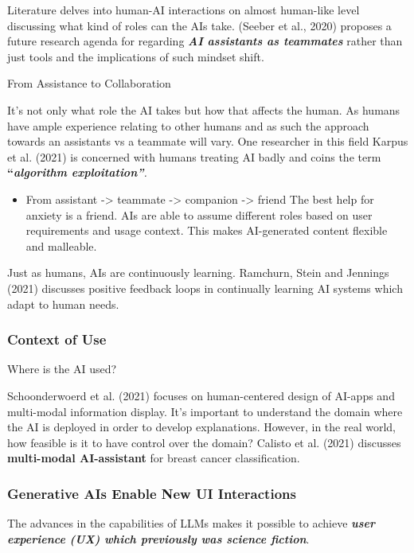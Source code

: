 \documentclass[
  letterpaper,
  DIV=11,
  numbers=noendperiod]{scrartcl}
\providecommand{\tightlist}{%
  \setlength{\itemsep}{0pt}\setlength{\parskip}{0pt}}\usepackage{longtable,booktabs,array}
\begin{document}
Literature delves into human-AI interactions on almost human-like level
discussing what kind of roles can the AIs take. (Seeber et al., 2020)
proposes a future research agenda for regarding \textbf{\emph{AI
assistants as teammates}} rather than just tools and the implications of
such mindset shift.

From Assistance to Collaboration

It's not only what role the AI takes but how that affects the human. As
humans have ample experience relating to other humans and as such the
approach towards an assistants vs a teammate will vary. One researcher
in this field Karpus et al. (2021) is concerned with humans treating AI
badly and coins the term \textbf{``\emph{algorithm
exploitation''}}\emph{.}

\begin{itemize}
\tightlist
\item
  From assistant -\textgreater{} teammate -\textgreater{} companion
  -\textgreater{} friend The best help for anxiety is a friend. AIs are
  able to assume different roles based on user requirements and usage
  context. This makes AI-generated content flexible and malleable.
\end{itemize}

Just as humans, AIs are continuously learning. Ramchurn, Stein and
Jennings (2021) discusses positive feedback loops in continually
learning AI systems which adapt to human needs.

\subsubsection{Context of Use}\label{context-of-use}

Where is the AI used?

Schoonderwoerd et al. (2021) focuses on human-centered design of AI-apps
and multi-modal information display. It's important to understand the
domain where the AI is deployed in order to develop explanations.
However, in the real world, how feasible is it to have control over the
domain? Calisto et al. (2021) discusses \textbf{multi-modal
AI-assistant} for breast cancer classification.

\subsubsection{Generative AIs Enable New UI
Interactions}\label{generative-ais-enable-new-ui-interactions}

The advances in the capabilities of LLMs makes it possible to achieve
\textbf{\emph{user experience (UX) which previously was science
fiction}}.
\end{document}
